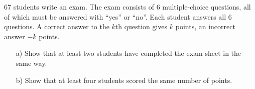 $67$ students write an exam. The exam consists of $6$ multiple-choice questions,
all of which must be answered with ``yes'' or ``no''. Each student answers all $6$ questions.
A correct answer to the $k$th question gives $k$ points, an incorrect answer $-k$ points.
\begin{enumerate}
    \item[a)] Show that at least two students have completed the exam sheet in the same way.
    \item[b)] Show that at least four students scored the same number of points.
\end{enumerate}
